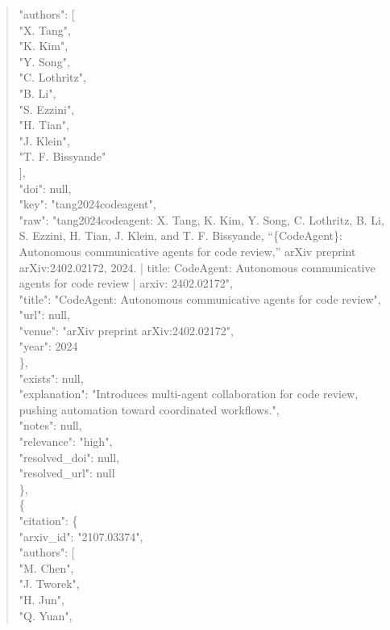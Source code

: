 \documentclass[11pt]{article}
\begin{document}
\begin{quote}
        "authors": [\\
          "X. Tang",\\
          "K. Kim",\\
          "Y. Song",\\
          "C. Lothritz",\\
          "B. Li",\\
          "S. Ezzini",\\
          "H. Tian",\\
          "J. Klein",\\
          "T. F. Bissyande"\\
        ],\\
        "doi": null,\\
        "key": "tang2024codeagent",\\
        "raw": "tang2024codeagent: X. Tang, K. Kim, Y. Song, C. Lothritz, B. Li, S. Ezzini, H. Tian, J. Klein, and T. F. Bissyande, ``\{CodeAgent\}: Autonomous communicative agents for code review,'' arXiv preprint arXiv:2402.02172, 2024. | title: CodeAgent: Autonomous communicative agents for code review | arxiv: 2402.02172",\\
        "title": "CodeAgent: Autonomous communicative agents for code review",\\
        "url": null,\\
        "venue": "arXiv preprint arXiv:2402.02172",\\
        "year": 2024\\
      \},\\
      "exists": null,\\
      "explanation": "Introduces multi-agent collaboration for code review, pushing automation toward coordinated workflows.",\\
      "notes": null,\\
      "relevance": "high",\\
      "resolved\_doi": null,\\
      "resolved\_url": null\\
    \},\\
    \{\\
      "citation": \{\\
        "arxiv\_id": "2107.03374",\\
        "authors": [\\
          "M. Chen",\\
          "J. Tworek",\\
          "H. Jun",\\
          "Q. Yuan",\\

\end{quote}
\end{document}
